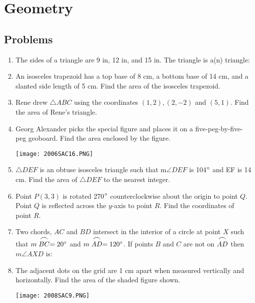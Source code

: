\documentclass[../uilmath.tex]{subfiles}
\begin{document}
\chapter{Geometry}
\section*{Problems}
\begin{enumerate}[label=\bfseries\arabic*.]
    \item %
    The sides of a triangle are 9 in, 12 in, and 15 in. The triangle is a(n) \blank triangle:

    \item %
    An isosceles trapezoid has a top base of 8 cm, a bottom base of 14 cm, and a slanted side length of 5 cm. Find the area of the isosceles trapezoid.

    \item %
    Rene drew $\triangle ABC$ using the coordinates $(1,2), (2,-2)$ and $(5,1)$. Find the area of Rene's triangle.

    \item %
    Georg Alexander picks the special figure and places it on a five-peg-by-five-peg geoboard. Find the area enclosed by the figure.
    \begin{center}
        \texttt{[image: 2006SAC16.PNG]}
    \end{center}

    \item %
    $\triangle DEF$ is an obtuse isosceles triangle such that m$\angle DEF$ is 104$\degree$ and EF is 14 cm. Find the area of $\triangle{DEF}$ to the nearest integer.

    \item %
    Point $P(3,3)$ is rotated 270$\degree$ counterclockwise about the origin to point $Q$. Point $Q$ is reflected across the $y$-axis to point $R$. Find the coordinates of point $R$.

    \item %
    Two chords, $AC$ and $BD$ intersect in the interior of a circle at point $X$ such that $m\stackrel{\mbox{\large$\frown$}}{BC}=20\degree$ and $m\stackrel{\mbox{\large$\frown$}}{AD}=120\degree$. If points $B$ and $C$ are not on $\stackrel{\mbox{\large$\frown$}}{AD}$ then $m\angle AXD$ is:

    \item %
    The adjacent dots on the grid are 1 cm apart when measured vertically and horizontally. Find the area of the shaded figure shown.
    \begin{center}
        \texttt{[image: 2008SAC9.PNG]}
    \end{center}


\end{enumerate}
\end{document}
